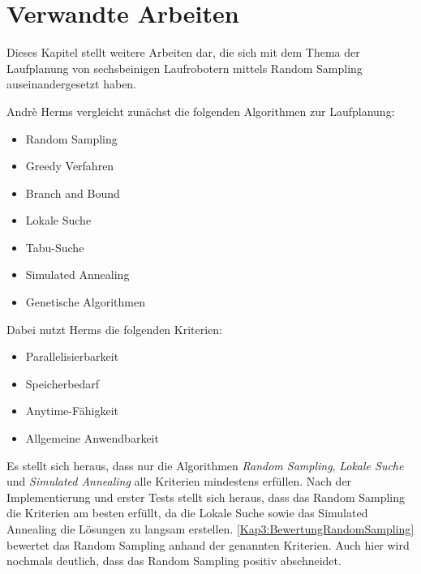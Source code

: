 \chapter{Verwandte Arbeiten}
\label{kap3}

Dieses Kapitel stellt weitere Arbeiten dar, die sich mit dem Thema der Laufplanung von sechsbeinigen Laufrobotern mittels Random Sampling auseinandergesetzt haben.

Andrè Herms \autocite{herms2004} vergleicht zunächst die folgenden Algorithmen zur Laufplanung:
\begin{itemize}
  \item Random Sampling
  \item Greedy Verfahren
  \item Branch and Bound
  \item Lokale Suche
  \item Tabu-Suche
  \item Simulated Annealing
  \item Genetische Algorithmen
\end{itemize}

Dabei nutzt Herms die folgenden Kriterien:
\begin{itemize}
  \item Parallelisierbarkeit
  \item Speicherbedarf
  \item Anytime-Fähigkeit
  \item Allgemeine Anwendbarkeit
\end{itemize}

Es stellt sich heraus, dass nur die Algorithmen \emph{Random Sampling}, \emph{Lokale Suche} und \emph{Simulated Annealing} alle Kriterien mindestens erfüllen. Nach der Implementierung und erster Tests stellt sich heraus, dass das Random Sampling die Kriterien am besten erfüllt, da die Lokale Suche sowie das Simulated Annealing die Lösungen zu langsam erstellen. \autoref{Kap3:BewertungRandomSampling} bewertet das Random Sampling anhand der genannten Kriterien. Auch hier wird nochmals deutlich, dass das Random Sampling positiv abschneidet.

